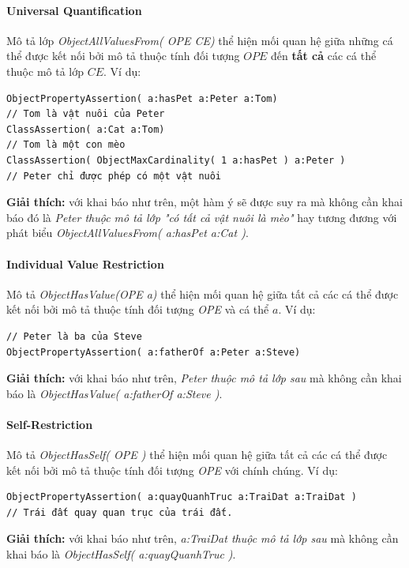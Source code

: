 \paragraph{Universal Quantification} Mô tả lớp \textit{ObjectAllValuesFrom( OPE CE)} thể hiện mối quan hệ giữa những cá thể được kết nối bởi mô tả thuộc tính đối tượng $OPE$ đến \textbf{tất cả} các cá thể thuộc mô tả lớp $CE$. Ví dụ: 
\begin{verbatim}
ObjectPropertyAssertion( a:hasPet a:Peter a:Tom)
// Tom là vật nuôi của Peter
ClassAssertion( a:Cat a:Tom) 
// Tom là một con mèo
ClassAssertion( ObjectMaxCardinality( 1 a:hasPet ) a:Peter )
// Peter chỉ được phép có một vật nuôi
\end{verbatim}
\textbf{Giải thích:} với khai báo như trên, một hàm ý sẽ được suy ra mà không cần khai báo đó là \textit{Peter thuộc mô tả lớp "có tất cả vật nuôi là mèo"} hay tương đương với phát biểu \textit{ObjectAllValuesFrom( a:hasPet a:Cat )}.

\paragraph{Individual Value Restriction} Mô tả  \textit{ObjectHasValue(OPE a)} thể hiện mối quan hệ giữa tất cả các cá thể được kết nối bởi mô tả thuộc tính đối tượng \textit{OPE} và cá thể $a$. Ví dụ:
\begin{verbatim}
// Peter là ba của Steve
ObjectPropertyAssertion( a:fatherOf a:Peter a:Steve)
\end{verbatim}
\textbf{Giải thích:} với khai báo như trên, \textit{Peter thuộc mô tả lớp sau} mà không cần khai báo là \textit{ObjectHasValue( a:fatherOf a:Steve )}.

\paragraph{Self-Restriction} Mô tả \textit{ObjectHasSelf( OPE )} thể hiện mối quan hệ giữa tất cả các cá thể được kết nối bởi mô tả thuộc tính đối tượng \textit{OPE} với chính chúng. Ví dụ:
\begin{verbatim}
ObjectPropertyAssertion( a:quayQuanhTruc a:TraiDat a:TraiDat )	
// Trái đất quay quan trục của trái đất.
\end{verbatim}
\textbf{Giải thích:} với khai báo như trên, \textit{a:TraiDat thuộc mô tả lớp sau} mà không cần khai báo là \textit{ObjectHasSelf( a:quayQuanhTruc )}.

